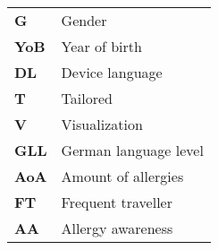 \begin{table}[H]
\begin{tabular}{ll}
\textbf{G}   & Gender                \\
\textbf{YoB} & Year of birth         \\
\textbf{DL}  & Device language       \\
\textbf{T}   & Tailored              \\
\textbf{V}   & Visualization         \\
\textbf{GLL} & German language level \\
\textbf{AoA} & Amount of allergies   \\
\textbf{FT}  & Frequent traveller    \\
\textbf{AA}  & Allergy awareness    
\end{tabular}
\end{table}

